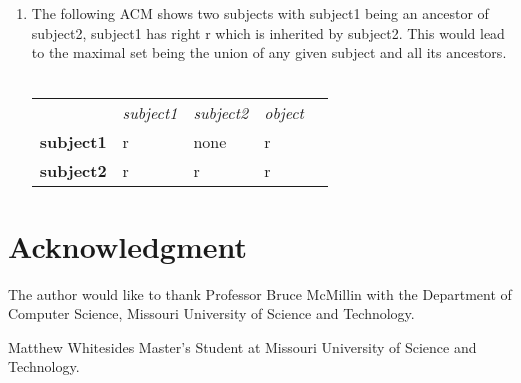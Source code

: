\documentclass[journal,onecolumn]{IEEEtran}
\begin{document}
\begin{enumerate}
\begin{enumerate}
    \item The following ACM shows two subjects with subject1 being an ancestor of subject2, subject1 has right r which is inherited by subject2. This would lead to the maximal set being the union of any given subject and all its ancestors. \\\\
    \begin{tabular}{lllll}
    & \textit{subject1} & \textit{subject2} & \textit{object} &  \\
    \textbf{subject1} & r                 & none              & r               &  \\
    \textbf{subject2} & r                 & r                 & r               & 
    \end{tabular}

  \end{enumerate}
\end{enumerate}




\section*{Acknowledgment}
The author would like to thank Professor Bruce McMillin with the Department of Computer Science, Missouri University of Science and Technology.

\ifCLASSOPTIONcaptionsoff
  \newpage
\fi

\begin{IEEEbiographynophoto}{Matthew Whitesides}
  Master's Student at Missouri University of Science and Technology.
\end{IEEEbiographynophoto}

\end{document}
